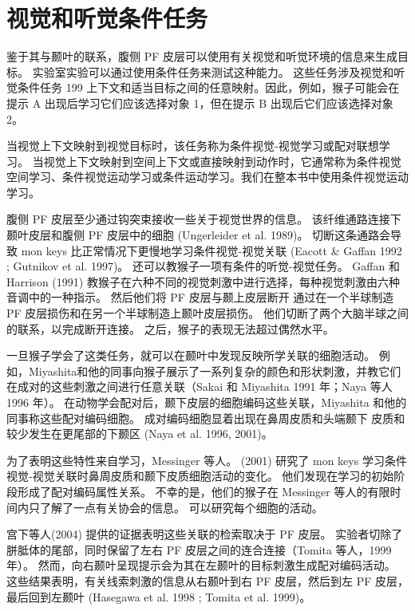\section{视觉和听觉条件任务}
\par
鉴于其与颞叶的联系，腹侧 PF 皮层可以使用有关视觉和听觉环境的信息来生成目标。 实验室实验可以通过使用条件任务来测试这种能力。 这些任务涉及视觉和听觉条件任务 199 上下文和适当目标之间的任意映射。因此，例如，猴子可能会在提示 A 出现后学习它们应该选择对象 1，但在提示 B 出现后它们应该选择对象 2。
\par
当视觉上下文映射到视觉目标时，该任务称为条件视觉-视觉学习或配对联想学习。 当视觉上下文映射到空间上下文或直接映射到动作时，它通常称为条件视觉空间学习、条件视觉运动学习或条件运动学习。我们在整本书中使用条件视觉运动学习。
\par
腹侧 PF 皮层至少通过钩突束接收一些关于视觉世界的信息。 该纤维通路连接下颞叶皮层和腹侧 PF 皮层中的细胞 (Ungerleider et al. 1989)。 切断这条通路会导致 mon keys 比正常情况下更慢地学习条件视觉-视觉关联 (Eacott & Gaffan 1992 ; Gutnikov et al. 1997)。
还可以教猴子一项有条件的听觉-视觉任务。 Gaffan 和 Harrison (1991) 教猴子在六种不同的视觉刺激中进行选择，每种视觉刺激由六种音调中的一种指示。 然后他们将 PF 皮层与颞上皮层断开
通过在一个半球制造 PF 皮层损伤和在另一个半球制造上颞叶皮层损伤。 他们切断了两个大脑半球之间的联系，以完成断开连接。 之后，猴子的表现无法超过偶然水平。
\par
一旦猴子学会了这类任务，就可以在颞叶中发现反映所学关联的细胞活动。 例如，Miyashita和他的同事向猴子展示了一系列复杂的颜色和形状刺激，并教它们在成对的这些刺激之间进行任意关联（Sakai 和 Miyashita 1991 年；Naya 等人 1996 年）。 在动物学会配对后，颞下皮层的细胞编码这些关联，Miyashita 和他的同事称这些配对编码细胞。 成对编码细胞显着出现在鼻周皮质和头端颞下
皮质和较少发生在更尾部的下颞区 (Naya et al. 1996, 2001)。
\par
为了表明这些特性来自学习，Messinger 等人。 (2001) 研究了 mon keys 学习条件视觉-视觉关联时鼻周皮质和颞下皮质细胞活动的变化。 他们发现在学习的初始阶段形成了配对编码属性关系。 不幸的是，他们的猴子在 Messinger 等人的有限时间内只了解了一点有关协会的信息。 可以研究每个细胞的活动。
\par
宫下等人(2004) 提供的证据表明这些关联的检索取决于 PF 皮层。 实验者切除了胼胝体的尾部，同时保留了左右 PF 皮层之间的连合连接（Tomita 等人，1999 年）。 然而，向右颞叶呈现提示会为其在左颞叶的目标刺激生成配对编码活动。 这些结果表明，有关线索刺激的信息从右颞叶到右 PF 皮层，然后到左 PF 皮层，最后回到左颞叶 (Hasegawa et al. 1998 ; Tomita et al. 1999)。
\par

